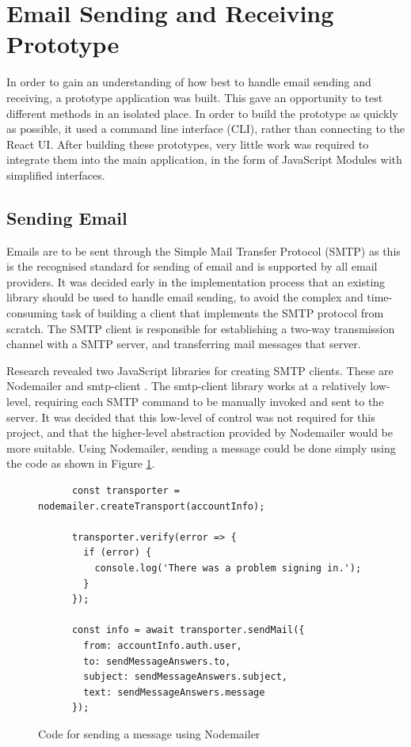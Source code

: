 \section{Email Sending and Receiving Prototype}
In order to gain an understanding of how best to handle email sending and receiving, a prototype application was built. This gave an opportunity to test different methods in an isolated place. In order to build the prototype as quickly as possible, it used a command line interface (CLI), rather than connecting to the React UI. After building these prototypes, very little work was required to integrate them into the main application, in the form of JavaScript Modules with simplified interfaces.

\subsection{Sending Email}
Emails are to be sent through the Simple Mail Transfer Protocol (SMTP) \cite{smtp-rfc} as this is the recognised standard for sending of email and is supported by all email providers. It was decided early in the implementation process that an existing library should be used to handle email sending, to avoid the complex and time-consuming task of building a client that implements the SMTP protocol from scratch. The SMTP client is responsible for establishing a two-way transmission channel with a SMTP server, and transferring mail messages that server.

Research revealed two JavaScript libraries for creating SMTP clients. These are Nodemailer \cite{nodemailer} and smtp-client \cite{smtp-client}. The smtp-client library works at a relatively low-level, requiring each SMTP command to be manually invoked and sent to the server. It was decided that this low-level of control was not required for this project, and that the higher-level abstraction provided by Nodemailer would be more suitable. Using Nodemailer, sending a message could be done simply using the code as shown in Figure \ref{fig:smtp-code}.

\begin{figure}[h!]
  \centering
    \begin{verbatim}
      const transporter = nodemailer.createTransport(accountInfo);

      transporter.verify(error => {
        if (error) {
          console.log('There was a problem signing in.');
        }
      });

      const info = await transporter.sendMail({
        from: accountInfo.auth.user,
        to: sendMessageAnswers.to,
        subject: sendMessageAnswers.subject,
        text: sendMessageAnswers.message
      });
    \end{verbatim}
  \caption{Code for sending a message using Nodemailer}
  \label{fig:smtp-code}
\end{figure}

